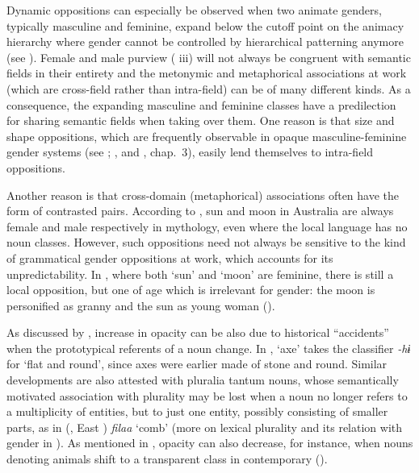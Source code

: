 \documentclass[output=collectionpaper]{langsci/langscibook}
\begin{document}
Dynamic oppositions can especially be observed when two animate genders, typically masculine and feminine, expand below the cutoff point on the animacy hierarchy where gender cannot be controlled by hierarchical patterning anymore (see ). Female and male purview ( iii) will not always be congruent with semantic fields in their entirety and the metonymic and metaphorical associations at work (which are cross-field rather than intra-field) can be of many different kinds. As a consequence, the expanding masculine and feminine classes have a predilection for sharing semantic fields when taking over them. One reason is that size and shape oppositions, which are frequently observable in opaque masculine-feminine gender systems (see ; , and \citealt{Aikhenvald2016}, chap.~3), easily lend themselves to intra-field oppositions.

Another reason is that cross-domain (metaphorical) associations often have the form of contrasted pairs. According to \cite[49]{Capell1970}, sun and moon in Australia are always female and male respectively in mythology, even where the local language has no noun classes. However, such oppositions need not always be sensitive to the kind of grammatical gender oppositions at work, which accounts for its unpredictability. In , where both `sun' and `moon' are feminine, there is still a local opposition, but one of age which is irrelevant for gender: the moon is personified as granny and the sun as young woman (\citealt[57]{Haas1940}).

As discussed by \cite[21]{Seifart2018}, increase in opacity can be also due to historical ``accidents'' when the prototypical referents of a noun change. In , `axe' takes the classifier \textit{-hɨ} for `flat and round', since axes were earlier made of stone and round. Similar developments are also attested with pluralia tantum nouns, whose semantically motivated association with plurality may be lost when a noun no longer refers to a multiplicity of entities, but to just one entity, possibly consisting of smaller parts, as in  (, East ) \textit{filaa} `comb' (more on lexical plurality and its relation with gender in ). As mentioned in , opacity can also decrease, for instance, when nouns denoting animals shift to a transparent class in contemporary   (\citealt[24]{Seifart2018}).
\end{document}
